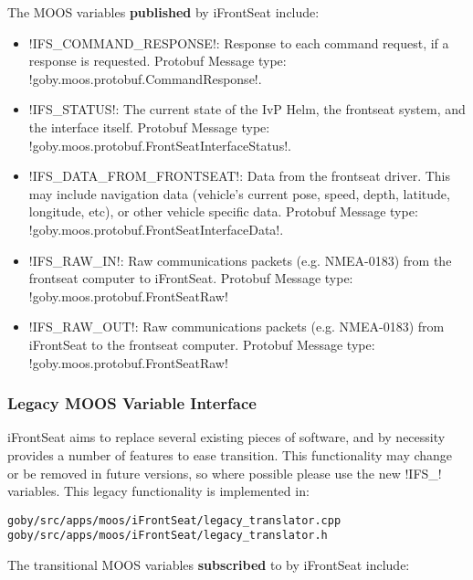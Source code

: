 The MOOS variables \textbf{published} by iFrontSeat include:
\begin{itemize}
\item !IFS_COMMAND_RESPONSE!: Response to each command request, if a response is requested. Protobuf Message type:  !goby.moos.protobuf.CommandResponse!.
\item !IFS_STATUS!: The current state of the IvP Helm, the frontseat system, and the interface itself. Protobuf Message type:  !goby.moos.protobuf.FrontSeatInterfaceStatus!.
\item !IFS_DATA_FROM_FRONTSEAT!: Data from the frontseat driver. This may include navigation data (vehicle's current pose, speed, depth, latitude, longitude, etc), or other vehicle specific data. Protobuf Message type: !goby.moos.protobuf.FrontSeatInterfaceData!.
\item !IFS_RAW_IN!: Raw communications packets (e.g. NMEA-0183) from the frontseat computer to iFrontSeat. Protobuf Message type: !goby.moos.protobuf.FrontSeatRaw!
\item !IFS_RAW_OUT!: Raw communications packets (e.g. NMEA-0183) from iFrontSeat to the frontseat computer. Protobuf Message type: !goby.moos.protobuf.FrontSeatRaw! 
\end{itemize}

\subsubsection{Legacy MOOS Variable Interface}\label{sec:ifrontseat_legacy_cfg}

iFrontSeat aims to replace several existing pieces of software, and by necessity provides a number of features to ease transition. This functionality may change or be removed in future versions, so where possible please use the new !IFS_! variables. This legacy functionality is implemented in:

\begin{verbatim}
goby/src/apps/moos/iFrontSeat/legacy_translator.cpp
goby/src/apps/moos/iFrontSeat/legacy_translator.h
\end{verbatim}

The transitional MOOS variables \textbf{subscribed} to by iFrontSeat include:

